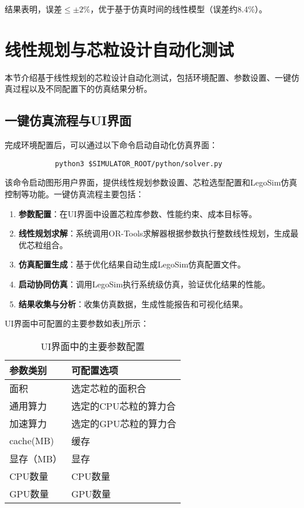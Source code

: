 \documentclass[bachelor]{thesis-uestc}
\begin{document}
结果表明，误差$\leq\pm2\%$，优于基于仿真时间的线性模型（误差约8.4\%）。


\section{线性规划与芯粒设计自动化测试}

本节介绍基于线性规划的芯粒设计自动化测试，包括环境配置、参数设置、一键仿真过程以及不同配置下的仿真结果分析。

\subsection{一键仿真流程与UI界面}

完成环境配置后，可以通过以下命令启动自动化仿真界面：

\begin{verbatim}
            python3 $SIMULATOR_ROOT/python/solver.py
\end{verbatim}

该命令启动图形用户界面，提供线性规划参数设置、芯粒选型配置和LegoSim仿真控制等功能。一键仿真流程主要包括：

\begin{enumerate}
    \item \textbf{参数配置}：在UI界面中设置芯粒库参数、性能约束、成本目标等。
    \item \textbf{线性规划求解}：系统调用OR-Tools求解器根据参数执行整数线性规划，生成最优芯粒组合。
    \item \textbf{仿真配置生成}：基于优化结果自动生成LegoSim仿真配置文件。
    \item \textbf{启动协同仿真}：调用LegoSim执行系统级仿真，验证优化结果的性能。
    \item \textbf{结果收集与分析}：收集仿真数据，生成性能报告和可视化结果。
\end{enumerate}

UI界面中可配置的主要参数如表\ref{tab:ui_parameters}所示：

\begin{table}[htbp]
\caption{UI界面中的主要参数配置}
\centering
\begin{tabular}{|l|p{10cm}|}
\hline
\textbf{参数类别} & \textbf{可配置选项} \\
\hline
面积 & 选定芯粒的面积合 \\
\hline
通用算力 & 选定的CPU芯粒的算力合 \\
\hline
加速算力 & 选定的GPU芯粒的算力合 \\
\hline
cache(MB) & 缓存 \\
\hline
显存（MB） & 显存 \\
\hline
CPU数量 & CPU数量 \\
\hline
GPU数量 & GPU数量 \\
\hline
\end{tabular}
\label{tab:ui_parameters}
\end{table}
\end{document}
